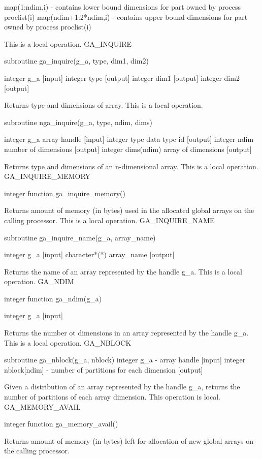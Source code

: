 map(1:ndim,i) - contains lower bound dimensions for part owned by
process proclist(i) map(ndim+1:2{*}ndim,i) - contains upper bound
dimensions for part owned by process proclist(i)

This is a local operation. GA\_INQUIRE

subroutine ga\_inquire(g\_a, type, dim1, dim2)

integer g\_a {[}input{]} integer type {[}output{]} integer dim1 {[}output{]}
integer dim2 {[}output{]}

Returns type and dimensions of array. This is a local operation.

subroutine nga\_inquire(g\_a, type, ndim, dims)

integer g\_a array handle {[}input{]} integer type data type id {[}output{]}
integer ndim number of dimensions {[}output{]} integer dims(ndim)
array of dimensions {[}output{]}

Returns type and dimensions of an n-dimensional array. This is a local
operation. GA\_INQUIRE\_MEMORY

integer function ga\_inquire\_memory()

Returns amount of memory (in bytes) used in the allocated global arrays
on the calling processor. This is a local operation. GA\_INQUIRE\_NAME

subroutine ga\_inquire\_name(g\_a, array\_name)

integer g\_a {[}input{]} character{*}({*}) array\_name {[}output{]}

Returns the name of an array represented by the handle g\_a. This
is a local operation. GA\_NDIM

integer function ga\_ndim(g\_a)

integer g\_a {[}input{]}

Returns the number ot dimensions in an array represented by the handle
g\_a. This is a local operation. GA\_NBLOCK

subroutine ga\_nblock(g\_a, nblock) integer g\_a - array handle {[}input{]}
integer nblock{[}ndim{]} - number of partitions for each dimension
{[}output{]}

Given a distribution of an array represented by the handle g\_a, returns
the number of partitions of each array dimension. This operation is
local. GA\_MEMORY\_AVAIL

integer function ga\_memory\_avail()

Returns amount of memory (in bytes) left for allocation of new global
arrays on the calling processor.

